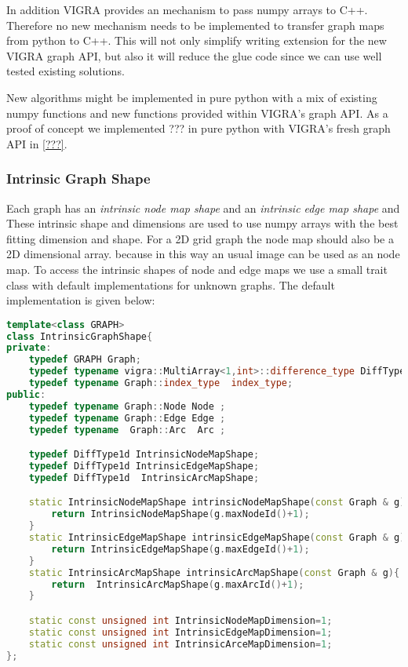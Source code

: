 In addition VIGRA provides an mechanism to pass numpy arrays to C++.
Therefore no new mechanism needs to be implemented to transfer graph
maps from python to C++.
This will not only simplify writing extension for the new VIGRA graph API,
but also it will reduce the glue code since we can use well tested existing
solutions.

New algorithms might be implemented in pure python with a mix of
existing numpy functions and new functions provided within VIGRA's graph API.
As a proof of concept we implemented ??? in pure python with VIGRA's
fresh graph API in \cref{???}.


\subsubsection{Intrinsic Graph Shape}

Each graph has an \emph{intrinsic node map shape} 
and an \emph{intrinsic edge map shape} and 
These intrinsic shape and dimensions are used to use 
numpy arrays with the best fitting dimension and shape.
For a 2D grid graph the node map should also be a 2D dimensional array.
because in this way an usual image can be used as an node map.
To access the  intrinsic shapes of node and edge maps 
we use a small trait class with default implementations
for unknown graphs.
The default implementation is given below:

\begin{minipage}{\textwidth}\vspace{-0.75cm}\begin{lstlisting}[language=c++]
template<class GRAPH>
class IntrinsicGraphShape{
private:
    typedef GRAPH Graph;
    typedef typename vigra::MultiArray<1,int>::difference_type DiffType1d;
    typedef typename Graph::index_type  index_type;
public:
    typedef typename Graph::Node Node ;
    typedef typename Graph::Edge Edge ;
    typedef typename  Graph::Arc  Arc ;

    typedef DiffType1d IntrinsicNodeMapShape;
    typedef DiffType1d IntrinsicEdgeMapShape;
    typedef DiffType1d  IntrinsicArcMapShape;

    static IntrinsicNodeMapShape intrinsicNodeMapShape(const Graph & g){
        return IntrinsicNodeMapShape(g.maxNodeId()+1);
    }
    static IntrinsicEdgeMapShape intrinsicEdgeMapShape(const Graph & g){
        return IntrinsicEdgeMapShape(g.maxEdgeId()+1);
    }
    static IntrinsicArcMapShape intrinsicArcMapShape(const Graph & g){
        return  IntrinsicArcMapShape(g.maxArcId()+1);
    }

    static const unsigned int IntrinsicNodeMapDimension=1;
    static const unsigned int IntrinsicEdgeMapDimension=1;
    static const unsigned int IntrinsicArceMapDimension=1;
};
\end{lstlisting}\end{minipage}\vspace{0.5cm}



